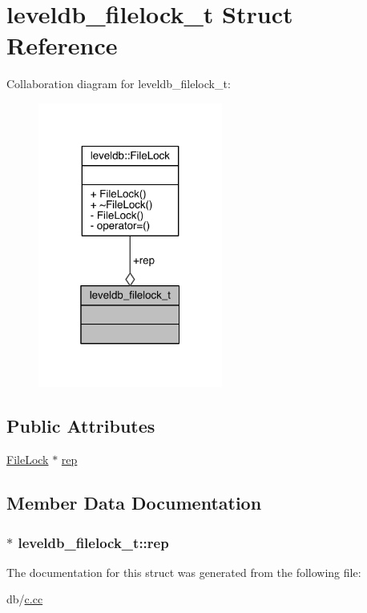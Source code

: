 \hypertarget{structleveldb__filelock__t}{}\section{leveldb\+\_\+filelock\+\_\+t Struct Reference}
\label{structleveldb__filelock__t}


Collaboration diagram for leveldb\+\_\+filelock\+\_\+t\+:\nopagebreak
\begin{figure}[H]
\begin{center}
\leavevmode
\includegraphics[width=172pt]{structleveldb__filelock__t__coll__graph}
\end{center}
\end{figure}
\subsection*{Public Attributes}
\begin{DoxyCompactItemize}
\item 
\hyperlink{classleveldb_1_1_file_lock}{File\+Lock} $\ast$ \hyperlink{structleveldb__filelock__t_a6c341dd7282427215e6b3ba47871a4f5}{rep}
\end{DoxyCompactItemize}


\subsection{Member Data Documentation}
\hypertarget{structleveldb__filelock__t_a6c341dd7282427215e6b3ba47871a4f5}{}
\subsubsection[{rep}]{$\ast$ leveldb\+\_\+filelock\+\_\+t\+::rep}\label{structleveldb__filelock__t_a6c341dd7282427215e6b3ba47871a4f5}


The documentation for this struct was generated from the following file\+:\begin{DoxyCompactItemize}
\item 
db/\hyperlink{c_8cc}{c.\+cc}\end{DoxyCompactItemize}
